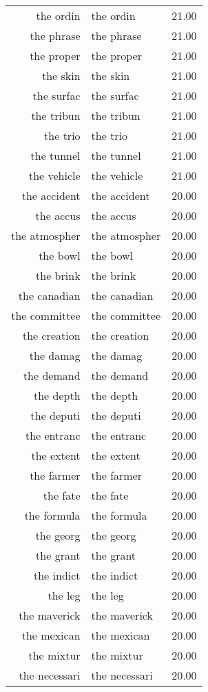 \begin{table}[ht]
\begin{tabular}{rlr}
  the ordin & the ordin & 21.00 \\ 
  the phrase & the phrase & 21.00 \\ 
  the proper & the proper & 21.00 \\ 
  the skin & the skin & 21.00 \\ 
  the surfac & the surfac & 21.00 \\ 
  the tribun & the tribun & 21.00 \\ 
  the trio & the trio & 21.00 \\ 
  the tunnel & the tunnel & 21.00 \\ 
  the vehicle & the vehicle & 21.00 \\ 
  the accident & the accident & 20.00 \\ 
  the accus & the accus & 20.00 \\ 
  the atmospher & the atmospher & 20.00 \\ 
  the bowl & the bowl & 20.00 \\ 
  the brink & the brink & 20.00 \\ 
  the canadian & the canadian & 20.00 \\ 
  the committee & the committee & 20.00 \\ 
  the creation & the creation & 20.00 \\ 
  the damag & the damag & 20.00 \\ 
  the demand & the demand & 20.00 \\ 
  the depth & the depth & 20.00 \\ 
  the deputi & the deputi & 20.00 \\ 
  the entranc & the entranc & 20.00 \\ 
  the extent & the extent & 20.00 \\ 
  the farmer & the farmer & 20.00 \\ 
  the fate & the fate & 20.00 \\ 
  the formula & the formula & 20.00 \\ 
  the georg & the georg & 20.00 \\ 
  the grant & the grant & 20.00 \\ 
  the indict & the indict & 20.00 \\ 
  the leg & the leg & 20.00 \\ 
  the maverick & the maverick & 20.00 \\ 
  the mexican & the mexican & 20.00 \\ 
  the mixtur & the mixtur & 20.00 \\ 
  the necessari & the necessari & 20.00 \\ 

\end{tabular}
\end{table}
